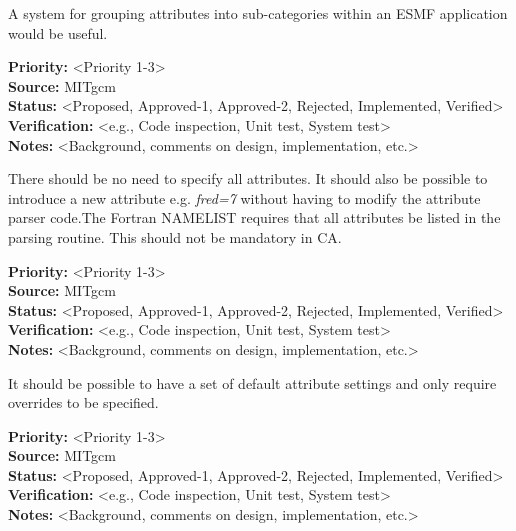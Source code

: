 
A system for grouping attributes into sub-categories within an ESMF application
would be useful. 

\begin{reqlist}
{\bf Priority:} <Priority 1-3> \\
{\bf Source:} MITgcm \\
{\bf Status:} <Proposed, Approved-1, Approved-2, Rejected, Implemented, Verified> \\
{\bf Verification:} <e.g., Code inspection, Unit test, System test> \\
{\bf Notes:} <Background, comments on design, implementation, etc.> 
\end{reqlist}

There should be no need to specify all attributes. It should also be possible
to introduce a new attribute e.g. {\it fred=7} without having to
modify the attribute parser code.The Fortran NAMELIST requires that all
attributes be listed in the parsing routine. This should not be mandatory in CA.

\begin{reqlist}
{\bf Priority:} <Priority 1-3> \\
{\bf Source:} MITgcm \\
{\bf Status:} <Proposed, Approved-1, Approved-2, Rejected, Implemented, Verified> \\
{\bf Verification:} <e.g., Code inspection, Unit test, System test> \\
{\bf Notes:} <Background, comments on design, implementation, etc.> 
\end{reqlist}

It should be possible to have a set of default attribute settings and
only require overrides to be specified.

\begin{reqlist}
{\bf Priority:} <Priority 1-3> \\
{\bf Source:} MITgcm \\
{\bf Status:} <Proposed, Approved-1, Approved-2, Rejected, Implemented, Verified> \\
{\bf Verification:} <e.g., Code inspection, Unit test, System test> \\
{\bf Notes:} <Background, comments on design, implementation, etc.> 
\end{reqlist}

